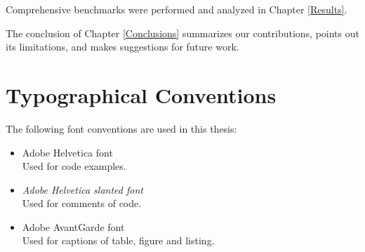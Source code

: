 Comprehensive benchmarks were performed and analyzed in Chapter \ref{Results}. 

The conclusion of Chapter \ref{Conclusions} summarizes our contributions, points out its limitations, and makes suggestions for future work.

\section{Typographical Conventions}
The following font conventions are used in this thesis:
\begin{itemize}
 \item {\selectfont Adobe Helvetica font}\\
 Used for code examples.
 \item {\selectfont \textsl{Adobe Helvetica slanted font}}\\
 Used for comments of code.
 \item {\selectfont Adobe AvantGarde font}\\
 Used for captions of table, figure and listing.
\end{itemize}
